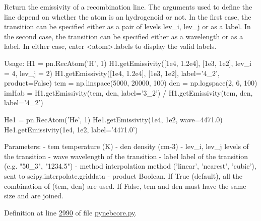 \begin{DoxyVerb}Return the emissivity of a recombination line. The arguments used to 
define the line depend on whether the atom is an hydrogenoid or not. 
In the first case, the transition can be specified either as a pair 
of levels lev_i, lev_j or as a label. 
In the second case, the transition can be specified either as a wavelength 
or as a label.
In either case, enter <atom>.labels to display the valid labels.

Usage:
    H1 = pn.RecAtom('H', 1)
    H1.getEmissivity([1e4, 1.2e4], [1e3, 1e2], lev_i = 4, lev_j = 2)
    H1.getEmissivity([1e4, 1.2e4], [1e3, 1e2], label='4_2', product=False)
    tem = np.linspace(5000, 20000, 100)
    den = np.logspace(2, 6, 100)
    imHab = H1.getEmissivity(tem, den, label='3_2') / H1.getEmissivity(tem, den, label='4_2')

    He1 = pn.RecAtom('He', 1)
    He1.getEmissivity(1e4, 1e2, wave=4471.0)
    He1.getEmissivity(1e4, 1e2, label='4471.0')
    
Parameters:
    - tem            temperature (K)
    - den            density (cm-3)
    - lev_i, lev_j   levels of the transition
    - wave           wavelength of the transition
    - label          label of the transition (e.g. "50_3", "1234.5")
    - method         interpolation method ('linear', 'nearest', 'cubic'), 
             sent to scipy.interpolate.griddata    
    - product        Boolean. If True (default), all the combination of (tem, den) are used. 
             If False, tem and den must have the same size and are joined.
\end{DoxyVerb}
 

Definition at line \hyperlink{pynebcore_8py_source_l02990}{2990} of file \hyperlink{pynebcore_8py_source}{pynebcore.\-py}.



